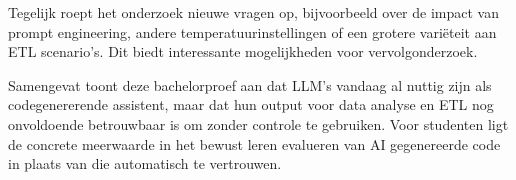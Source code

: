 Tegelijk roept het onderzoek nieuwe vragen op, bijvoorbeeld over de impact van prompt engineering, andere temperatuurinstellingen of een grotere variëteit aan ETL scenario's. Dit biedt interessante mogelijkheden voor vervolgonderzoek.

Samengevat toont deze bachelorproef aan dat LLM's vandaag al nuttig zijn als codegenererende assistent, maar dat hun output voor data analyse en ETL nog onvoldoende betrouwbaar is om zonder controle te gebruiken. Voor studenten ligt de concrete meerwaarde in het bewust leren evalueren van AI gegenereerde code in plaats van die automatisch te vertrouwen.
